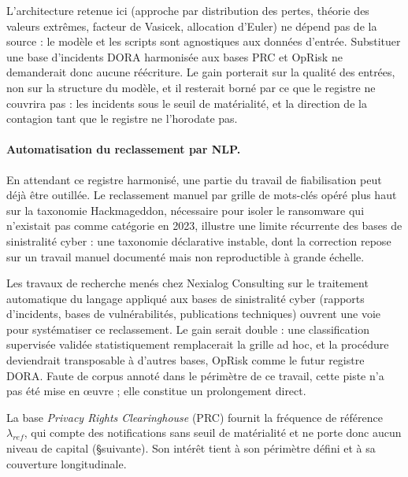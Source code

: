 L'architecture retenue ici (approche par distribution des pertes, théorie des valeurs
extrêmes, facteur de Vasicek, allocation d'Euler) ne dépend pas de la source : le modèle et les
scripts sont agnostiques aux données d'entrée. Substituer une base d'incidents DORA harmonisée
aux bases PRC et OpRisk ne demanderait donc aucune réécriture. Le gain porterait sur la qualité
des entrées, non sur la structure du modèle, et il resterait borné par ce que le registre ne
couvrira pas : les incidents sous le seuil de matérialité, et la direction de la contagion tant
que le registre ne l'horodate pas.

\paragraph{Automatisation du reclassement par NLP.} En attendant ce registre harmonisé, une
partie du travail de fiabilisation peut déjà être outillée. Le reclassement manuel par grille
de mots-clés opéré plus haut sur la taxonomie Hackmageddon, nécessaire pour isoler le
ransomware qui n'existait pas comme catégorie en 2023, illustre une limite récurrente des
bases de sinistralité cyber : une taxonomie déclarative instable, dont la correction repose
sur un travail manuel documenté mais non reproductible à grande échelle.

Les travaux de recherche menés chez Nexialog Consulting sur le traitement automatique du
langage appliqué aux bases de sinistralité cyber (rapports d'incidents, bases de
vulnérabilités, publications techniques) ouvrent une voie pour systématiser ce reclassement.
Le gain serait double : une classification supervisée validée statistiquement remplacerait la
grille ad hoc, et la procédure deviendrait transposable à d'autres bases, OpRisk comme le
futur registre DORA. Faute de corpus annoté dans le périmètre de ce travail, cette piste n'a
pas été mise en \oe uvre ; elle constitue un prolongement direct.



La base \emph{Privacy Rights Clearinghouse} (PRC) fournit la fréquence de
référence $\lambda_{ref}$, qui compte des notifications sans seuil de
matérialité et ne porte donc aucun niveau de capital (\S suivante). Son intérêt
tient à son périmètre défini et à sa couverture longitudinale.

